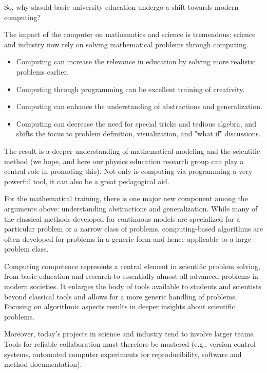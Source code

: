 So, why should basic university education undergo a shift towards modern computing?

The impact of the computer on mathematics and science is tremendous: science and industry now rely on solving mathematical problems through computing.
\begin{itemize}
\item Computing can increase the relevance in education by solving more realistic problems earlier.

\item Computing through programming can be excellent training of creativity.

\item Computing can enhance the understanding of abstractions and generalization.

\item Computing can decrease the need for special tricks and tedious algebra, and shifts the focus to problem definition, visualization, and "what if" discussions.
\end{itemize}

\noindent
The result is a deeper understanding of mathematical modeling and the scientific method (we hope, and here our physics education research group can play a central role in promoting this).
Not only is computing via programming a very powerful tool, it can also be a great pedagogical aid.

For the mathematical training, there is one major new component among the arguments above: understanding abstractions and generalization. While many of the classical methods developed for continuous models are specialized for a particular problem or a narrow class of problems, computing-based algorithms are often developed for problems in a generic form and hence applicable to a large problem class.


Computing competence represents a central element in scientific problem solving, from basic education and research to essentially almost all advanced problems in modern societies. It enlarges the body of tools available to students and scientists beyond classical tools and allows for a more generic handling of problems. Focusing on algorithmic aspects results in deeper insights about scientific problems.

Moreover, today's projects in science and industry tend to involve larger teams. Tools for reliable collaboration must therefore be mastered (e.g., version control systems, automated computer experiments for reproducibility, software and method documentation).


